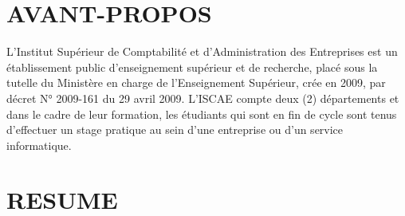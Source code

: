 \documentclass[a4paper, 12pt]{report}
\begin{document}
	 \chapter*{AVANT-PROPOS} \label{chap:1AVANT-PROPOS}
	L’Institut Supérieur de Comptabilité et d’Administration des Entreprises est un établissement public d’enseignement supérieur et de recherche, placé sous la tutelle du Ministère en charge de l’Enseignement Supérieur, crée en 2009, par décret N° 2009-161 du 29 avril 2009.
	\newline
	L’ISCAE compte deux (2) départements et dans le cadre de leur formation, les étudiants qui sont en fin de cycle sont tenus d’effectuer un stage pratique au sein d’une entreprise ou d’un service informatique.
	\thispagestyle{empty}
	\chapter*{RESUME} \label{chap:1Resumé}

		
\end{document}
